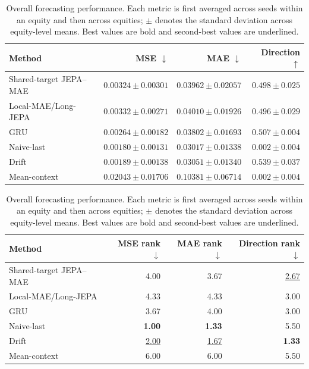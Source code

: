 \begin{table}[t]
\centering
\small
\caption{Overall forecasting performance. Each metric is first averaged across seeds within an equity and then across equities; $\pm$ denotes the standard deviation across equity-level means. Best values are bold and second-best values are underlined.}
\label{tab:main_metrics}
\begin{tabular}{lrrr}
\toprule
Method & MSE $\downarrow$ & MAE $\downarrow$ & Direction $\uparrow$ \\
\midrule
Shared-target JEPA--MAE & $0.00324 \pm 0.00301$ & $0.03962 \pm 0.02057$ & $0.498 \pm 0.025$ \\
Local-MAE/Long-JEPA & $0.00332 \pm 0.00271$ & $0.04010 \pm 0.01926$ & $0.496 \pm 0.029$ \\
GRU & $0.00264 \pm 0.00182$ & $0.03802 \pm 0.01693$ & \underline{$0.507 \pm 0.004$} \\
Naive-last & \textbf{$0.00180 \pm 0.00131$} & \textbf{$0.03017 \pm 0.01338$} & $0.002 \pm 0.004$ \\
Drift & \underline{$0.00189 \pm 0.00138$} & \underline{$0.03051 \pm 0.01340$} & \textbf{$0.539 \pm 0.037$} \\
Mean-context & $0.02043 \pm 0.01706$ & $0.10381 \pm 0.06714$ & $0.002 \pm 0.004$ \\
\bottomrule
\end{tabular}
\par\medskip
\begin{tabular}{lrrr}
\toprule
Method & MSE rank $\downarrow$ & MAE rank $\downarrow$ & Direction rank $\downarrow$ \\
\midrule
Shared-target JEPA--MAE & 4.00 & 3.67 & \underline{2.67} \\
Local-MAE/Long-JEPA & 4.33 & 4.33 & 3.00 \\
GRU & 3.67 & 4.00 & 3.00 \\
Naive-last & \textbf{1.00} & \textbf{1.33} & 5.50 \\
Drift & \underline{2.00} & \underline{1.67} & \textbf{1.33} \\
Mean-context & 6.00 & 6.00 & 5.50 \\
\bottomrule
\end{tabular}
\end{table}
